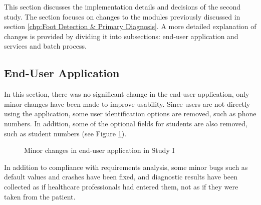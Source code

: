 This section discusses the implementation details and decisions of the second study. The section focuses on changes to the modules previously discussed in section \ref{chp:Foot Detection & Primary Diagnosis}. A more detailed explanation of changes is provided by dividing it into subsections: end-user application and services and batch process.

\subsection{End-User Application}

In this section, there was no significant change in the end-user application, only minor changes have been made to improve usability. Since users are not directly using the application, some user identification options are removed, such as phone numbers. In addition, some of the optional fields for students are also removed, such as student numbers (see Figure \ref{fig:UserApplicationStudyIChanges}).

\begin{figure}[htbp]
\centering
{}
\caption{Minor changes in end-user application in Study I}
\label{fig:UserApplicationStudyIChanges}
\end{figure}

In addition to compliance with requirements analysis, some minor bugs such as default values and crashes have been fixed, and diagnostic results have been collected as if healthcare professionals had entered them, not as if they were taken from the patient.

